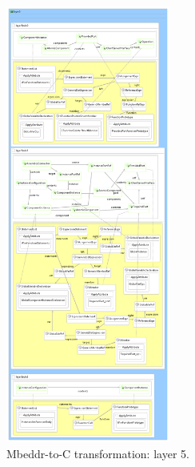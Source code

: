 \begin{figure}
\begin{center}
  \includegraphics[width=0.48\textwidth]{figures/mbeddr/mbeddr2C_optimized_layer_5}
  \caption{Mbeddr-to-C transformation: layer 5.}
  \label{fig:mb2c_layer_5}
\end{center}
\end{figure}







